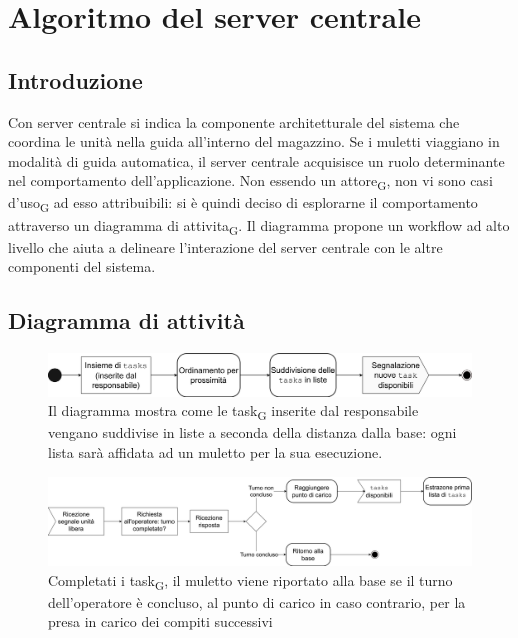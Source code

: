 \section{Algoritmo del server centrale}
\subsection{Introduzione}
Con server centrale si indica la componente architetturale del sistema che coordina le unità nella guida all'interno del magazzino. Se i muletti viaggiano in modalità di guida automatica, il server centrale acquisisce un ruolo determinante nel comportamento dell'applicazione. Non essendo un attore\textsubscript{G}, non vi sono casi d'uso\textsubscript{G} ad esso attribuibili: si è quindi deciso di esplorarne il comportamento attraverso un diagramma di attivita\textsubscript{G}. Il diagramma propone un workflow ad alto livello che aiuta a delineare l'interazione del server centrale con le altre componenti del sistema.



\subsection{Diagramma di attività}

\begin{figure}[H]
	\centering
	\includegraphics[scale=0.35]{res/images/diagramma_di_attivita3.png}
	\caption[Diagramma di attivita\textsubscript{G} per l'ordinamento  delle tasks]{Il diagramma mostra come le task\textsubscript{G} inserite dal responsabile vengano suddivise in liste a seconda della distanza dalla base: ogni lista sarà affidata ad un muletto per la sua esecuzione.}
\end{figure}

\begin{figure}[H]
	\centering
	\includegraphics[scale=0.35]{res/images/diagramma_di_attivita1.png}
	\caption[Diagramma di attivita\textsubscript{G} per la gestione del muletto dopo il completamento della lista di tasks]{Completati i task\textsubscript{G}, il muletto viene riportato alla base se il turno dell'operatore è concluso, al punto di carico in caso contrario, per la presa in carico dei compiti successivi}
\end{figure}



